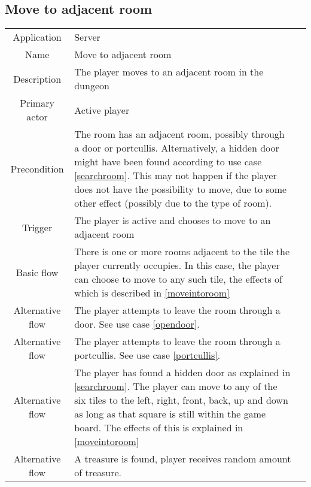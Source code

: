 \subsection{Move to adjacent room}
\label{moveoutfromroom}
\begin{tabular}{|c| p{9cm}|c}
\hline
Application & Server \\
Name & Move to adjacent room \\
Description & The player moves to an adjacent room in the dungeon \\
Primary actor & Active player \\
Precondition & The room has an adjacent room, possibly through a door or portcullis. Alternatively, a hidden door might have been found according to use case \ref{searchroom}. This may not happen if the player does not have the possibility to move, due to some other effect (possibly due to the type of room). \\
Trigger & The player is active and chooses to move to an adjacent room  \\ \hline
Basic flow & There is one or more rooms adjacent to the tile the player currently occupies. In this case, the player can choose to move to any such tile, the effects of which is described in \ref{moveintoroom} \\ \hline
Alternative flow & The player attempts to leave the room through a door. See use case \ref{opendoor}. \\\hline
Alternative flow & The player attempts to leave the room through a portcullis. See use case \ref{portcullis}. \\ \hline
Alternative flow & The player has found a hidden door as explained in \ref{searchroom}. The player can move to any of the six tiles to the left, right, front, back, up and down as long as that square is still within the game board. The effects of this is explained in \ref{moveintoroom} \\ \hline
Alternative flow & A treasure is found, player receives random amount of treasure. \\
\hline
\end{tabular}

